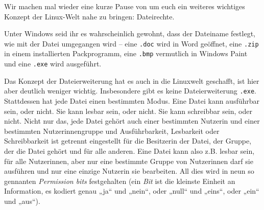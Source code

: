 
Wir machen mal wieder eine kurze Pause von \Cpp um euch ein weiteres wichtiges
Konzept der Linux-Welt nahe zu bringen: Dateirechte.

Unter Windows seid ihr es wahrscheinlich gewohnt, dass der Dateiname festlegt,
wie mit der Datei umgegangen wird -- eine \texttt{.doc} wird in Word geöffnet,
eine \texttt{.zip} in einem installierten Packprogramm, eine \texttt{.bmp}
vermutlich in Windows Paint und eine \texttt{.exe} wird ausgeführt.

Das Konzept der Dateierweiterung hat es auch in die Linuxwelt geschafft, ist
hier aber deutlich weniger wichtig. Insbesondere gibt es keine Dateierweiterung
\texttt{.exe}. Stattdessen hat jede Datei einen bestimmten Modus. Eine Datei
kann ausführbar sein, oder nicht. Sie kann lesbar sein, oder nicht. Sie kann
schreibbar sein, oder nicht. Nicht nur das, jede Datei gehört auch einer
bestimmten Nutzerin und einer bestimmten Nutzerinnengruppe und Ausführbarkeit,
Lesbarkeit oder Schreibbarkeit ist getrennt eingestellt für die Besitzerin der
Datei, der Gruppe, der die Datei gehört und für alle anderen. Eine Datei kann
also z.B. lesbar sein, für alle Nutzerinnen, aber nur eine bestimmte Gruppe von
Nutzerinnen darf sie ausführen und nur eine einzige Nutzerin sie bearbeiten. All
dies wird in neun so gennanten \emph{Permission bits} festgehalten (ein
\emph{Bit} ist die kleinste Einheit an Information, es kodiert genau „ja“ und
„nein“, oder „null“ und „eins“, oder „ein“ und „aus“).

